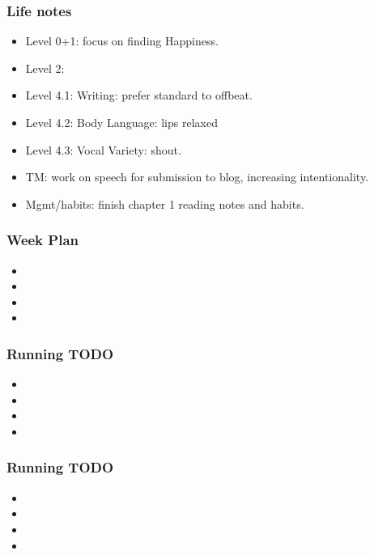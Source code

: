 \documentclass[serif, mathserif, final]{beamer}
\begin{document}
      \begin{frame}
        \frametitle{Life notes}
        \begin{itemize}
          \tiny \item \tiny Level 0+1: focus on finding Happiness.
        \item \tiny Level 2: 
        \item \tiny Level 4.1: Writing: prefer standard to offbeat.
        \item \tiny Level 4.2: Body Language: lips relaxed
        \item \tiny Level 4.3: Vocal Variety: shout.
        \item \tiny TM: work on speech for submission to blog,
          increasing intentionality.
        \item \tiny Mgmt/habits: finish chapter 1 reading notes and
          habits.
        \end{itemize}
      \end{frame} 


    \begin{frame}
      \frametitle{Week Plan} 
        \begin{itemize}
          \tiny \item \tiny
        \item \tiny
        \item \tiny
        \item \tiny
        \end{itemize}
      \end{frame}

    \begin{frame}
      \frametitle{Running TODO} 
        \begin{itemize}
          \tiny \item \tiny
        \item \tiny
        \item \tiny
        \item \tiny
        \end{itemize}
      \end{frame}


    \begin{frame}
      \frametitle{Running TODO} 
        \begin{itemize}
          \tiny \item \tiny
        \item \tiny
        \item \tiny
        \item \tiny
        \end{itemize}
      \end{frame}
\end{document}
